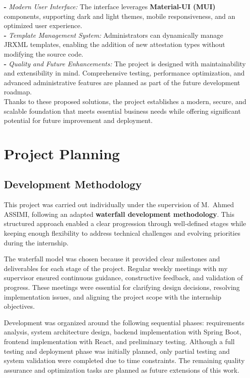 \documentclass[a4paper,12pt]{report}
\begin{document}
\begin{doublespace}
\textbf{-} \textit{Modern User Interface:} The interface leverages \textbf{Material-UI (MUI)} components, supporting dark and light themes, mobile responsiveness, and an optimized user experience. \\

\textbf{-} \textit{Template Management System:} Administrators can dynamically manage JRXML templates, enabling the addition of new attestation types without modifying the source code. \\

\textbf{-} \textit{Quality and Future Enhancements:} The project is designed with maintainability and extensibility in mind. Comprehensive testing, performance optimization, and advanced administrative features are planned as part of the future development roadmap. \\

Thanks to these proposed solutions, the project establishes a modern, secure, and scalable foundation that meets essential business needs while offering significant potential for future improvement and deployment.\\
\end{doublespace}



\section{Project Planning}

\subsection{Development Methodology}
This project was carried out individually under the supervision of M.\ Ahmed ASSIMI, following an adapted \textbf{waterfall development methodology}. This structured approach enabled a clear progression through well-defined stages while keeping enough flexibility to address technical challenges and evolving priorities during the internship.

The waterfall model was chosen because it provided clear milestones and deliverables for each stage of the project. Regular weekly meetings with my supervisor ensured continuous guidance, constructive feedback, and validation of progress. These meetings were essential for clarifying design decisions, resolving implementation issues, and aligning the project scope with the internship objectives.

Development was organized around the following sequential phases: requirements analysis, system architecture design, backend implementation with Spring Boot, frontend implementation with React, and preliminary testing. Although a full testing and deployment phase was initially planned, only partial testing and system validation were completed due to time constraints. The remaining quality assurance and optimization tasks are planned as future extensions of this work.
\end{document}
